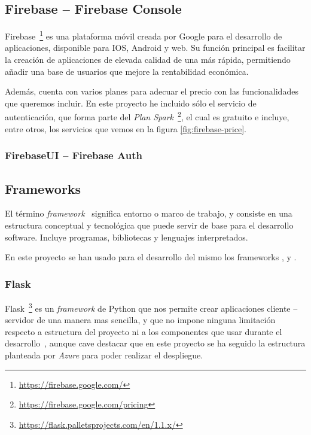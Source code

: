 \subsection{Firebase -- Firebase Console}
Firebase~\footnote{\url{https://firebase.google.com/}} es una plataforma móvil creada por Google para el desarrollo de aplicaciones, disponible para IOS, Android y web. Su función principal es facilitar la creación de aplicaciones de elevada calidad de una más rápida, permitiendo añadir una base de usuarios que mejore la rentabilidad económica.


Además, cuenta con varios planes para adecuar el precio con las funcionalidades que queremos incluir. En este proyecto he incluido sólo el servicio de autenticación, que forma parte del \textit{Plan Spark}~\footnote{\url{https://firebase.google.com/pricing}}, el cual es gratuito e incluye, entre otros, los servicios que vemos en la figura \ref{fig:firebase-price}.




\subsubsection{FirebaseUI -- Firebase Auth}

\subsection{Frameworks}
El término \textit{framework}~\cite{wiki:framework} significa entorno o marco de trabajo, y consiste en una estructura conceptual y tecnológica que puede servir de base para el desarrollo software. Incluye programas, bibliotecas y lenguajes interpretados.


En este proyecto se han usado para el desarrollo del mismo los frameworks ,  y .


\subsubsection{Flask}\label{sub:flask}
Flask~\footnote{\url{https://flask.palletsprojects.com/en/1.1.x/}} es un \textit{framework} de Python que nos permite crear aplicaciones cliente -- servidor de una manera mas sencilla, y que no impone ninguna limitación respecto a estructura del proyecto ni a los componentes que usar durante el desarrollo~\cite{grinberg2014flask}, aunque cave destacar que en este proyecto se ha seguido la estructura planteada por \textit{Azure} para poder realizar el despliegue.

